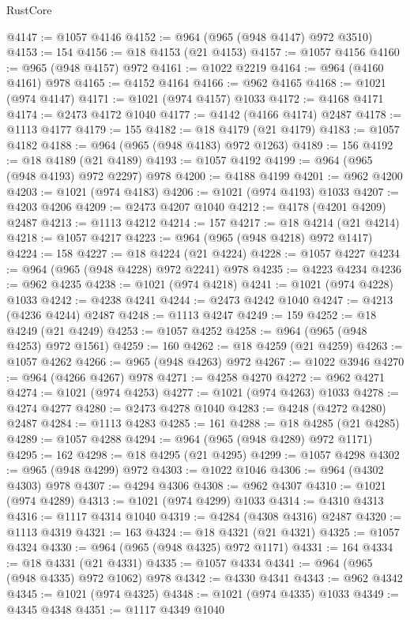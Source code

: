 \begin{lexlean}{RustCore}
\begin{coremodule}
@4147 := @1057 @4146
@4152 := @964 (@965 (@948 @4147) @972 @3510)
@4153 := 154
@4156 := @18 @4153 (@21 @4153)
@4157 := @1057 @4156
@4160 := @965 (@948 @4157) @972
@4161 := @1022 @2219
@4164 := @964 (@4160 @4161) @978
@4165 := @4152 @4164
@4166 := @962 @4165
@4168 := @1021 (@974 @4147)
@4171 := @1021 (@974 @4157) @1033
@4172 := @4168 @4171
@4174 := @2473 @4172 @1040
@4177 := @4142 (@4166 @4174) @2487
@4178 := @1113 @4177
@4179 := 155
@4182 := @18 @4179 (@21 @4179)
@4183 := @1057 @4182
@4188 := @964 (@965 (@948 @4183) @972 @1263)
@4189 := 156
@4192 := @18 @4189 (@21 @4189)
@4193 := @1057 @4192
@4199 := @964 (@965 (@948 @4193) @972 @2297) @978
@4200 := @4188 @4199
@4201 := @962 @4200
@4203 := @1021 (@974 @4183)
@4206 := @1021 (@974 @4193) @1033
@4207 := @4203 @4206
@4209 := @2473 @4207 @1040
@4212 := @4178 (@4201 @4209) @2487
@4213 := @1113 @4212
@4214 := 157
@4217 := @18 @4214 (@21 @4214)
@4218 := @1057 @4217
@4223 := @964 (@965 (@948 @4218) @972 @1417)
@4224 := 158
@4227 := @18 @4224 (@21 @4224)
@4228 := @1057 @4227
@4234 := @964 (@965 (@948 @4228) @972 @2241) @978
@4235 := @4223 @4234
@4236 := @962 @4235
@4238 := @1021 (@974 @4218)
@4241 := @1021 (@974 @4228) @1033
@4242 := @4238 @4241
@4244 := @2473 @4242 @1040
@4247 := @4213 (@4236 @4244) @2487
@4248 := @1113 @4247
@4249 := 159
@4252 := @18 @4249 (@21 @4249)
@4253 := @1057 @4252
@4258 := @964 (@965 (@948 @4253) @972 @1561)
@4259 := 160
@4262 := @18 @4259 (@21 @4259)
@4263 := @1057 @4262
@4266 := @965 (@948 @4263) @972
@4267 := @1022 @3946
@4270 := @964 (@4266 @4267) @978
@4271 := @4258 @4270
@4272 := @962 @4271
@4274 := @1021 (@974 @4253)
@4277 := @1021 (@974 @4263) @1033
@4278 := @4274 @4277
@4280 := @2473 @4278 @1040
@4283 := @4248 (@4272 @4280) @2487
@4284 := @1113 @4283
@4285 := 161
@4288 := @18 @4285 (@21 @4285)
@4289 := @1057 @4288
@4294 := @964 (@965 (@948 @4289) @972 @1171)
@4295 := 162
@4298 := @18 @4295 (@21 @4295)
@4299 := @1057 @4298
@4302 := @965 (@948 @4299) @972
@4303 := @1022 @1046
@4306 := @964 (@4302 @4303) @978
@4307 := @4294 @4306
@4308 := @962 @4307
@4310 := @1021 (@974 @4289)
@4313 := @1021 (@974 @4299) @1033
@4314 := @4310 @4313
@4316 := @1117 @4314 @1040
@4319 := @4284 (@4308 @4316) @2487
@4320 := @1113 @4319
@4321 := 163
@4324 := @18 @4321 (@21 @4321)
@4325 := @1057 @4324
@4330 := @964 (@965 (@948 @4325) @972 @1171)
@4331 := 164
@4334 := @18 @4331 (@21 @4331)
@4335 := @1057 @4334
@4341 := @964 (@965 (@948 @4335) @972 @1062) @978
@4342 := @4330 @4341
@4343 := @962 @4342
@4345 := @1021 (@974 @4325)
@4348 := @1021 (@974 @4335) @1033
@4349 := @4345 @4348
@4351 := @1117 @4349 @1040

\end{coremodule}
\end{lexlean}
